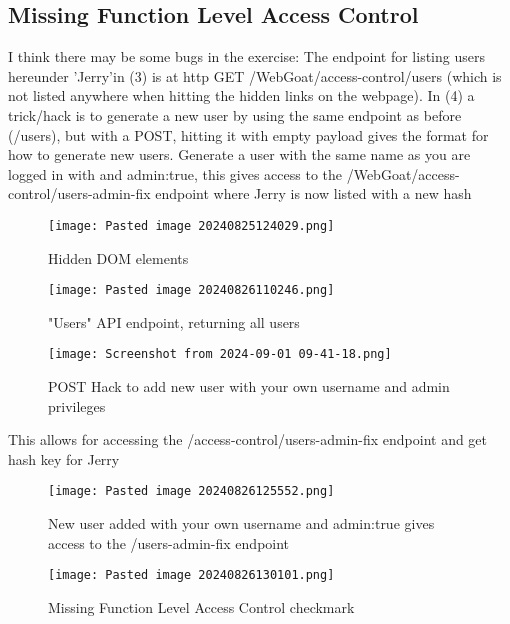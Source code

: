 \documentclass[
	letterpaper, %
	10pt, %
	unnumberedsections, %
	twoside, %
]{APAAssignment}
\begin{document}
\begin{appendices}
\subsection{Missing Function Level Access Control}\label{app:MisingFunctionLevelAccessControl}
I think there may be some bugs in the exercise: The endpoint for listing users hereunder 'Jerry'in (3) is at http GET /WebGoat/access-control/users (which is not listed anywhere when hitting the hidden links on the webpage). In (4) a trick/hack is to generate a new user by using the same endpoint as before (/users), but with a POST, hitting it with empty payload {} gives the format for how to generate new users. Generate a user with the same name as you are logged in with and admin:true, this gives access to the  /WebGoat/access-control/users-admin-fix endpoint where Jerry is now listed with a new hash   
   
\begin{figure} %
	\centering
	\texttt{[image: Pasted image 20240825124029.png]}
	\caption{Hidden DOM elements}
	\label{fig:HiddenDomElements}
\end{figure}

\begin{figure} %
	\centering
	\texttt{[image: Pasted image 20240826110246.png]}
	\caption{"Users" API endpoint, returning all users}
	\label{fig:UsersEndpoint}
\end{figure}





\begin{figure} %
	\centering
	\texttt{[image: Screenshot from 2024-09-01 09-41-18.png]}
	\caption{POST Hack to add new user with your own username and admin privileges}
	\label{fig:AddSelfUserUserHack}
\end{figure}

This allows for accessing the /access-control/users-admin-fix endpoint and get hash key for Jerry


\begin{figure} %
	\texttt{[image: Pasted image 20240826125552.png]}
	\caption{New user added with your own username and admin:true gives access to the /users-admin-fix endpoint}
	\label{fig:AddedNewUser}
\end{figure}

\begin{figure} %
	\centering
	\texttt{[image: Pasted image 20240826130101.png]}
	\caption{Missing Function Level Access Control checkmark}
	\label{fig:MissingFuctionAccessControlCheck}
\end{figure}


\end{appendices}
\end{document}
